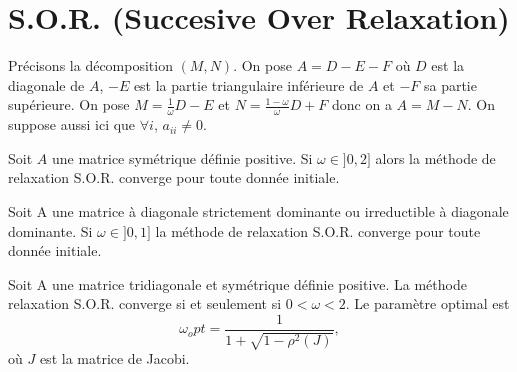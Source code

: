 \documentclass[a4paper,10pt]{article}
\begin{document}
\section{S.O.R. (Succesive Over Relaxation)}

Précisons la décomposition $(M, N)$. On pose $A = D - E - F$ où $D$ est la diagonale
de $A$, $-E$ est la partie triangulaire inférieure de $A$ et $-F$ sa partie supérieure.
On pose $M = \frac{1}{\omega}D - E$ et $N = \frac{1 - \omega}{\omega}D + F$ donc on a
$A = M - N$. On suppose aussi ici que $\forall i,\, a_{ii} \neq 0$.

\begin{prop}
Soit $A$ une matrice symétrique définie positive. Si $\omega \in ]0, 2]$ alors la
méthode de relaxation S.O.R. converge pour toute donnée initiale.
\end{prop}

\begin{prop}
Soit A une matrice à diagonale strictement dominante ou irreductible à diagonale dominante.
Si $\omega \in ]0, 1]$ la méthode de relaxation S.O.R. converge pour toute donnée
initiale.
\end{prop}

\begin{prop}
Soit A une matrice tridiagonale et symétrique définie positive. La méthode relaxation
S.O.R. converge si et seulement si $0 < \omega < 2$. Le paramètre optimal est
\[
    \displaystyle \omega_opt = \frac{1}{1 + \sqrt{1 - \rho^2(J)}},
\]
où $J$ est la matrice de Jacobi.
\end{prop}
\end{document}
